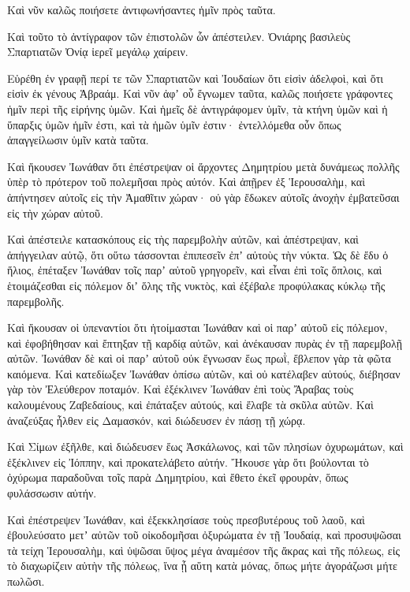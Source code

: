 {Καὶ νῦν καλῶς ποιήσετε ἀντιφωνήσαντες ἡμῖν πρὸς ταῦτα.
\par }{\PP {}Καὶ τοῦτο τὸ ἀντίγραφον τῶν ἐπιστολῶν ὧν ἀπέστειλεν. Ὀνιάρης
βασιλεὺς Σπαρτιατῶν Ὀνίᾳ ἱερεῖ μεγάλῳ χαίρειν.
\par }{\PP {}Εὑρέθη ἐν γραφῇ περί τε τῶν Σπαρτιατῶν καὶ Ἰουδαίων ὅτι εἰσὶν ἀδελφοὶ, καὶ ὅτι εἰσὶν ἐκ γένους Ἁβραάμ.
Καὶ νῦν ἀφʼ οὗ ἔγνωμεν ταῦτα, καλῶς ποιήσετε γράφοντες ἡμῖν περὶ τῆς εἰρήνης ὑμῶν.
Καὶ ἡμεῖς δὲ ἁντιγράφομεν ὑμῖν, τὰ κτήνη ὑμῶν καὶ ἡ ὕπαρξις ὑμῶν ἡμῖν ἐστι, καὶ τὰ ἡμῶν ὑμῖν ἐστιν· ἐντελλόμεθα οὖν ὅπως ἀπαγγείλωσιν ὑμῖν κατὰ ταῦτα.
\par }{\PP {}Καὶ ἤκουσεν Ἰωνάθαν ὅτι ἐπέστρεψαν οἱ ἄρχοντες Δημητρίου μετὰ δυνάμεως πολλῆς ὑπὲρ τὸ πρότερον τοῦ πολεμῆσαι πρὸς αὐτόν.
Καὶ ἀπῇρεν ἐξ Ἱερουσαλὴμ, καὶ ἀπήντησεν αὐτοῖς εἰς τὴν Ἀμαθῖτιν χώραν· οὐ γὰρ ἔδωκεν αὐτοῖς ἀνοχὴν ἐμβατεῦσαι εἰς τὴν χώραν αὐτοῦ.
\par }{\PP {}Καὶ ἀπέστειλε κατασκόπους εἰς τὴς παρεμβολὴν αὐτῶν, καὶ ἀπέστρεψαν, καὶ ἀπήγγειλαν αὐτῷ, ὅτι οὕτω τάσσονται ἐπιπεσεῖν ἐπʼ αὐτοὺς τὴν νύκτα.
Ὡς δὲ ἔδυ ὁ ἥλιος, ἐπέταξεν Ἰωνάθαν τοῖς παρʼ αὐτοῦ γρηγορεῖν, καὶ εἶναι ἐπὶ τοῖς ὅπλοις, καὶ ἑτοιμάζεσθαι εἰς πόλεμον διʼ ὅλης τῆς νυκτὸς, καὶ ἐξέβαλε προφύλακας κύκλῳ τῆς παρεμβολῆς.
\par }{\PP {}Καὶ ἤκουσαν οἱ ὑπεναντίοι ὅτι ἡτοίμασται Ἰωνάθαν καὶ οἱ παρʼ αὐτοῦ εἰς πόλεμον, καὶ ἐφοβήθησαν καὶ ἔπτηξαν τῇ καρδίᾳ αὐτῶν, καὶ ἀνέκαυσαν πυρὰς ἐν τῇ παρεμβολῇ αὐτῶν.
Ἰωνάθαν δὲ καὶ οἱ παρʼ αὐτοῦ οὐκ ἔγνωσαν ἕως πρωῒ, ἔβλεπον γὰρ τὰ φῶτα καιόμενα.
Καὶ κατεδίωξεν Ἰωνάθαν ὀπίσω αὐτῶν, καὶ οὐ κατέλαβεν αὐτούς, διέβησαν γὰρ τὸν Ἐλεύθερον ποταμόν.
Καὶ ἐξέκλινεν Ἰωνάθαν ἐπὶ τοὺς Ἄραβας τοὺς καλουμένους Ζαβεδαίους, καὶ ἐπάταξεν αὐτούς, καὶ ἔλαβε τὰ σκῦλα αὐτῶν.
Καὶ ἀναζεύξας ἦλθεν εἰς Δαμασκόν, καὶ διώδευσεν ἐν πάσῃ τῇ χώρᾳ.
\par }{\PP {}Καὶ Σίμων ἐξῆλθε, καὶ διώδευσεν ἕως Ἀσκάλωνος, καὶ τῶν πλησίων ὀχυρωμάτων, καὶ ἐξέκλινεν εἰς Ἰόππην, καὶ προκατελάβετο αὐτήν.
Ἤκουσε γὰρ ὅτι βούλονται τὸ ὀχύρωμα παραδοῦναι τοῖς παρὰ Δημητρίου, καὶ ἔθετο ἐκεῖ φρουρὰν, ὅπως φυλάσσωσιν αὐτήν.
\par }{\PP {}Καὶ ἐπέστρεψεν Ἰωνάθαν, καὶ ἐξεκκλησίασε τοὺς πρεσβυτέρους τοῦ λαοῦ, καὶ ἐβουλεύσατο μετʼ αὐτῶν τοῦ οἰκοδομῆσαι ὀξυρώματα ἐν τῇ Ἰουδαίᾳ,
καὶ προσυψῶσαι τὰ τείχη Ἱερουσαλὴμ, καὶ ὑψῶσαι ὕψος μέγα ἀναμέσον τῆς ἄκρας καὶ τῆς πόλεως, εἰς τὸ διαχωρίζειν αὐτὴν τῆς πόλεως, ἵνα ᾖ αὕτη κατὰ μόνας, ὅπως μήτε ἀγοράζωσι μήτε πωλῶσι.
}
